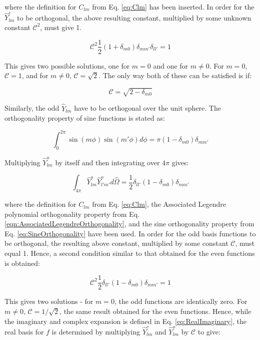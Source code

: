 \documentclass[10pt]{article}
\begin{document}
\begin{flushleft}
\begin{tcolorbox}[breakable]
where the definition for \(C_{lm}\) from Eq. \eqref{eq:Clm} has been inserted. In order for the \(\hat{Y}_{lm}^e\) to be orthogonal, the above resulting constant, multiplied by some unknown constant \(\mathscr{C}^2\), must give 1. 

\begin{equation}
\mathscr{C}^2\frac{1}{2}(1+\delta_{m0})\delta_{mm'}\delta_{ll'}=1
\end{equation}

This gives two possible solutions, one for \(m=0\) and one for \(m\neq 0\). For \(m=0\), \(\mathscr{C}=1\), and for \(m\neq0\), \(\mathscr{C}=\sqrt{2}\). The only way both of these can be satisfied is if:

\begin{equation}
\mathscr{C}=\sqrt{2-\delta_{m0}}
\end{equation}

Similarly, the odd \(\hat{Y}_{lm}\) have to be orthogonal over the unit sphere. The orthogonality property of sine functions is stated as:

\begin{equation}
\label{eq:SineOrthogonality}
\int_{0}^{2\pi}\sin{(m\phi)}\sin{(m'\phi)}d\phi=\pi(1-\delta_{m0})\delta_{mm'}
\end{equation}

Multiplying \(\hat{Y}_{lm}^o\) by itself and then integrating over \(4\pi\) gives:

\begin{equation}
\label{eq:OddRequriedOrthogonality2}
\int_{4\pi}^{}\hat{Y}_{lm}^o\hat{Y}_{l'm'}^od\hat{\Omega}=\frac{1}{2}\delta_{ll'}(1-\delta_{m0})\delta_{mm'}
\end{equation}

where the definition for \(C_{lm}\) from Eq. \eqref{eq:Clm}, the Associated Legendre polynomial orthogonality property from Eq. \eqref{eqn:AssociatedLegendreOrthogonality}, and the sine orthogonality property from Eq. \eqref{eq:SineOrthogonality} have been used. In order for the odd basis functions to be orthogonal, the resulting above constant, multiplied by some constant \(\mathscr{C}\), must equal 1. Hence, a second condition similar to that obtained for the even functions is obtained:

\begin{equation}
\mathscr{C}^2\frac{1}{2}\delta_{ll'}(1-\delta_{m0})\delta_{mm'}=1
\end{equation} 

This gives two solutions - for \(m=0\), the odd functions are identically zero. For \(m\neq0\), \(\mathscr{C}=1/\sqrt{2}\), the same result obtained for the even functions. Hence, while the imaginary and complex expansion is defined in Eq. \eqref{eq:RealImaginary}, the real basis for \(f\) is determined by multiplying \(\hat{Y}_{lm}^e\) and \(\hat{Y}_{lm}^o\) by \(\mathscr{C}\) to give:


\end{tcolorbox}
\end{flushleft}
\end{document}
